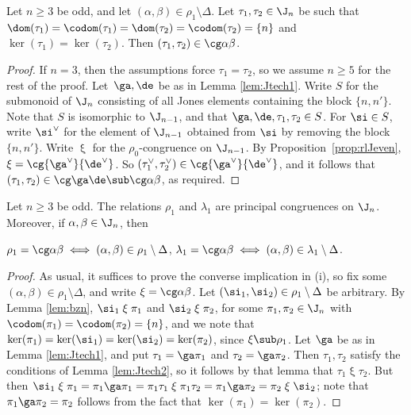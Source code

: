 %
\begin{lemma}\label{lem:Jtech2}
Let $n\geq3$ be odd, and let $(\alpha,\beta)\in\rho_1\setminus\Delta$.  Let $\tau_1,\tau_2\in\J_n$ be such that $\dom(\tau_1)=\codom(\tau_1)=\dom(\tau_2)=\codom(\tau_2)=\{n\}$ and $\ker(\tau_1)=\ker(\tau_2)$.
Then $(\tau_1,\tau_2)\in\cg\alpha\beta$.
\end{lemma}

\begin{proof} If $n=3$, then the assumptions force $\tau_1=\tau_2$, so we assume $n\geq5$ for the rest of the proof.  Let~$\ga,\de$ be as in Lemma \ref{lem:Jtech1}.  Write $S$ for the submonoid of $\J_n$ consisting of all Jones elements containing the block $\{n,n'\}$.  Note that $S$ is isomorphic to $\J_{n-1}$, and that $\ga,\de,\tau_1,\tau_2\in S$.  For $\si\in S$, write $\si^\vee$ for the element of $\J_{n-1}$ obtained from $\si$ by removing the block $\{n,n'\}$.  Write $\mathrel\xi$ for the $\rho_0$-congruence on $\J_{n-1}$.  By Proposition~\ref{prop:rlJeven}, ${\mathrel\xi}=\cg{\ga^\vee}{\de^\vee}$.  So $(\tau_1^\vee,\tau_2^\vee)\in\cg{\ga^\vee}{\de^\vee}$, and it follows that $(\tau_1,\tau_2)\in\cg\ga\de\sub\cg\alpha\beta$, as required. \end{proof}



%
\begin{proposition}\label{prop:rlJodd}
Let $n\geq3$ be odd.  The relations $\rho_1$ and $\lambda_1$ are principal congruences on $\J_n$.  Moreover, if $\alpha,\beta\in\J_n$, then
\begin{itemize}\begin{multicols}{2}
 $\rho_1=\cg\alpha\beta\iff (\alpha,\beta)\in\rho_1\setminus\Delta$,
 $\lambda_1=\cg\alpha\beta\iff (\alpha,\beta)\in\lambda_1\setminus\Delta$.
\end{multicols}\end{itemize}
\end{proposition}

\begin{proof} As usual, it suffices to prove the converse implication in (i), so fix some $(\alpha,\beta)\in\rho_1\setminus\Delta$, and
write ${\mathrel\xi}=\cg\alpha\beta$.
Let $(\si_1,\si_2)\in\rho_1\setminus\Delta$ be arbitrary.
By Lemma \ref{lem:bzn}, $\si_1\mathrel\xi\pi_1$ and $\si_2\mathrel\xi\pi_2$, for some $\pi_1,\pi_2\in\J_n$ with $\codom(\pi_1)=\codom(\pi_2)=\{n\}$, and we note that $\ker(\pi_1)=\ker(\si_1)=\ker(\si_2)=\ker(\pi_2)$, since ${\mathrel\xi}\sub\rho_1$.
Let $\ga$ be as in Lemma \ref{lem:Jtech1}, and put $\tau_1=\ga\pi_1$ and $\tau_2=\ga\pi_2$.  Then $\tau_1,\tau_2$ satisfy the conditions of Lemma \ref{lem:Jtech2}, so it follows by that lemma that $\tau_1\mathrel\xi\tau_2$.  But then $\si_1\mathrel\xi\pi_1=\pi_1\ga\pi_1=\pi_1\tau_1\mathrel\xi\pi_1\tau_2=\pi_1\ga\pi_2=\pi_2\mathrel\xi\si_2$; note that $\pi_1\ga\pi_2=\pi_2$ follows from the fact that $\ker(\pi_1)=\ker(\pi_2)$. \end{proof}


